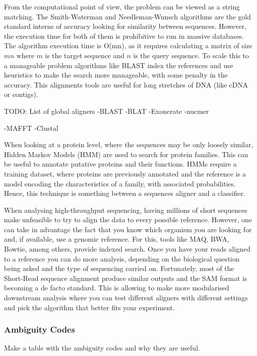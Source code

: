 From the computational point of view, the problem can be viewed as a string matching. The Smith-Waterman\cite{Smith1981} and Needleman-Wunsch\cite{Needleman1970} algorithms are the gold standard interns of accuracy looking for similarity between sequences. However, the execution time for both of them is prohibitive to run in massive databases. The algorithm execution time is O(mn), as it requires calculating a matrix of size $mn$ where $m$ is the target sequence and $n$ is the query sequence.  To scale this to a manageable problem algorithms like BLAST index the references and use heuristics to make the search more manageable, with some penalty in the accuracy. This alignments tools are useful for long stretches of DNA (like cDNA or contigs)\cite{Altschul1990}.

TODO: List of global aligners
-BLAST
-BLAT
-Exonerate
-nucmer

-MAFFT
-Clustal


When looking at a protein level, where the sequences may be only loosely similar, Hidden Markov Models (HMM) are used to search for protein families. This can be useful to annotate putative proteins and their functions. HMMs require a training dataset, where proteins are previously annotated and the reference is a model encoding the characteristics of a family, with associated probabilities. Hence, this technique is something between a sequences aligner and a classifier\cite{Eddy2004}. 

When analysing high-throughput sequencing, having millions of short sequences make unfeasible to try to align the data to every possible reference. However, one can take in advantage the fact that you know which organism you are looking for and, if available, use a genomic reference. For this, tools like MAQ, BWA, Bowtie, among others, provide indexed search.  Once you have your reads aligned to a reference you can do more analysis, depending on the biological question being asked and the type of sequencing carried on.  Fortunately, most of the Short-Read sequence alignment produce similar outputs and the SAM format is becoming a de facto standard. This is allowing to make more modularised downstream analysis where you can test different aligners with different settings and pick the algorithm that better fits your experiment\cite{Liu2012,Li2009,Li2009a}. 

\subsubsection{Ambiguity Codes}
\label{lit:ambiguity}
Make a table with the ambiguity codes and why they are useful. 




